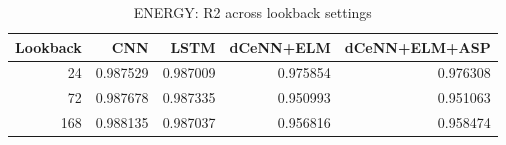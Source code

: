 \begin{table}
\caption{ENERGY: R2 across lookback settings}
\begin{tabular}{rrrrr}
\toprule
Lookback & CNN & LSTM & dCeNN+ELM & dCeNN+ELM+ASP \\
\midrule
24 & 0.987529 & 0.987009 & 0.975854 & 0.976308 \\
72 & 0.987678 & 0.987335 & 0.950993 & 0.951063 \\
168 & 0.988135 & 0.987037 & 0.956816 & 0.958474 \\
\bottomrule
\end{tabular}
\end{table}
